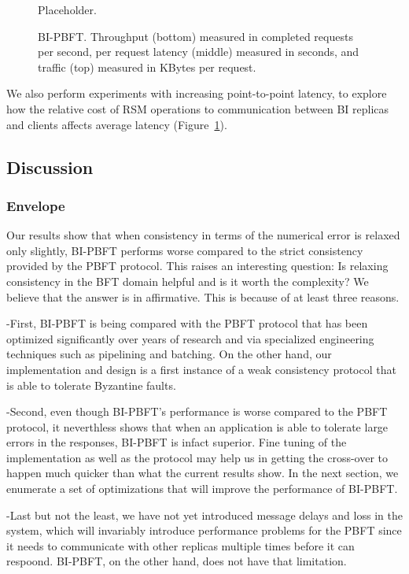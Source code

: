 \documentclass[twocolumn,10pt]{article}
\begin{document}
\begin{figure}
\centering
Placeholder.
\caption{BI-PBFT. Throughput (bottom) measured in completed requests per second,
  per request latency (middle) measured in seconds, and traffic
  (top) measured in KBytes per request.}
\label{fig:bi-pbft-increasedLatency}
\end{figure}

We also perform experiments with increasing point-to-point latency, to
explore how the relative cost of RSM operations to communication between
BI replicas and clients affects average latency (Figure~\ref{fig:bi-pbft-increasedLatency}).
\fi




\subsection{Discussion}


\subsubsection{Envelope}
Our results show that when consistency in terms of the numerical error is relaxed only slightly, BI-PBFT
performs worse compared to the strict consistency provided by the PBFT protocol. This raises an interesting
question: Is relaxing consistency in the BFT domain helpful and is it worth the complexity? 
We believe that the answer is in affirmative.
This is because of at least three reasons. 

-First, BI-PBFT is being compared with the PBFT protocol that has
been optimized significantly over years of research and via specialized engineering techniques 
such as pipelining and batching. On
the other hand, our implementation and design is a first instance of a weak consistency protocol that is able
to tolerate Byzantine faults.

-Second, even though BI-PBFT's performance is worse compared to the PBFT protocol, it neverthless
shows that when an application is able to tolerate large errors in the responses, BI-PBFT is infact superior.
Fine tuning of the implementation as well as the protocol may help us in getting the cross-over to happen
much quicker than what the current results show. In the next section, we enumerate a set of optimizations
that will improve the performance of BI-PBFT.

-Last but not the least, we have not yet introduced message
delays and loss in the system, which will invariably introduce performance problems for the PBFT since it needs
to communicate with other replicas multiple times before it can respoond. BI-PBFT, on the other hand, does not
have that limitation. 
\end{document}
